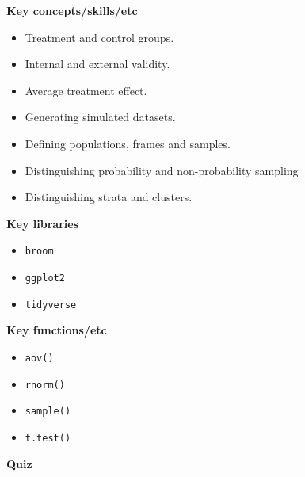 \documentclass[
]{book}
\providecommand{\tightlist}{%
  \setlength{\itemsep}{0pt}\setlength{\parskip}{0pt}}
\begin{document}
\textbf{Key concepts/skills/etc}

\begin{itemize}
\tightlist
\item
  Treatment and control groups.
\item
  Internal and external validity.
\item
  Average treatment effect.
\item
  Generating simulated datasets.
\item
  Defining populations, frames and samples.
\item
  Distinguishing probability and non-probability sampling
\item
  Distinguishing strata and clusters.
\end{itemize}

\textbf{Key libraries}

\begin{itemize}
\tightlist
\item
  \texttt{broom}
\item
  \texttt{ggplot2}
\item
  \texttt{tidyverse}
\end{itemize}

\textbf{Key functions/etc}

\begin{itemize}
\tightlist
\item
  \texttt{aov()}
\item
  \texttt{rnorm()}
\item
  \texttt{sample()}
\item
  \texttt{t.test()}
\end{itemize}

\textbf{Quiz}
\end{document}
